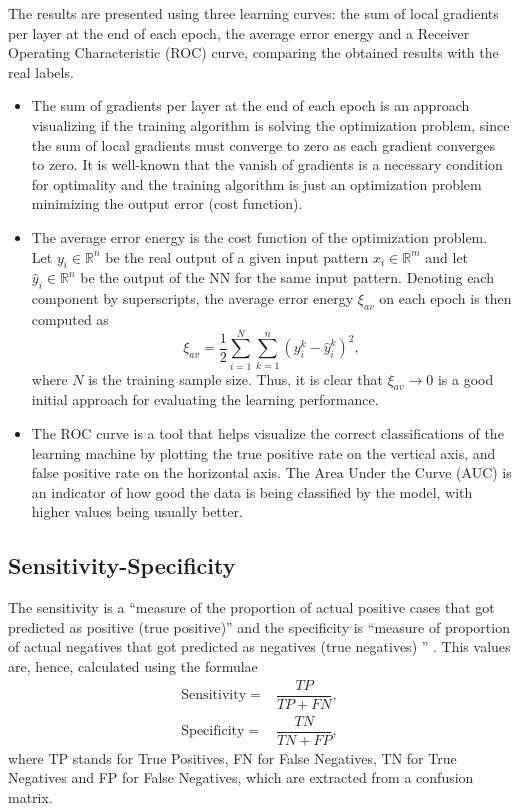 \documentclass[conference]{IEEEtran}
\theoremstyle{definition}
\theoremstyle{remark}
\theoremstyle{remark}
\begin{document}
The results are presented using three learning curves: the sum of local
gradients per layer at the end of each epoch, the average error energy and a
Receiver Operating Characteristic (ROC) curve, comparing the obtained results
with the real labels.
%
\begin{itemize}
  \item The sum of gradients per layer at the end of each epoch is an approach
        visualizing if the training algorithm is solving the optimization
        problem, since the sum of local gradients must converge to zero as each
        gradient converges to zero. It is well-known that the vanish of
        gradients is a necessary condition for optimality and the training
        algorithm is just an optimization problem minimizing the output error
        (cost function).
  \item The average error energy is the cost function of the optimization
        problem. Let $y_i\in\mathbb{R}^n$ be the real output of a given input
        pattern $x_i\in\mathbb{R}^m$ and let $\hat{y}_i\in\mathbb{R}^n$ be the
        output of the NN for the same input pattern. Denoting each component by
        superscripts, the average error energy $\xi_{av}$ on each epoch is then
        computed as
        \begin{equation}
          \xi_{av}=\dfrac{1}{2}\sum_{i=1}^{N}\sum_{k=1}^n\left(y^k_i-\hat{y}^k_i\right)^2,
        \end{equation}
        where $N$ is the training sample size. Thus, it is clear that
        $\xi_{av}\rightarrow0$ is a good initial approach for evaluating the
        learning performance.
  \item The ROC curve is a tool that helps visualize the correct classifications
        of the learning machine by plotting the true positive rate on the
        vertical axis, and false positive rate on the horizontal axis. The Area
        Under the Curve (AUC) is an indicator of how good the data is being
        classified by the model, with higher values being usually better.
\end{itemize}

\subsection{Sensitivity-Specificity}
The sensitivity is a ``measure of the proportion of actual positive cases that
got predicted as positive (true positive)'' and the specificity is ``measure of
proportion of actual negatives that got predicted as negatives (true negatives)
'' \parencite{sens}. This values are, hence, calculated using the formulae
%
\begin{align}
  \mathrm{Sensitivity}=&\dfrac{TP}{TP+FN}, \\
  \mathrm{Specificity} =& \dfrac{TN}{TN+FP},
\end{align}
%
where TP stands for True Positives, FN for False Negatives, TN for True
Negatives and FP for False Negatives, which are extracted from a confusion
matrix.
\end{document}
